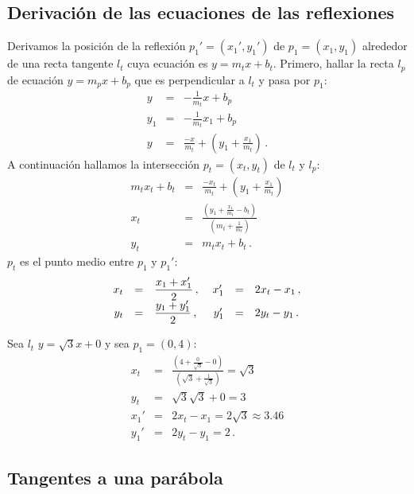 
\subsection{Derivación de las ecuaciones de las reflexiones}

Derivamos la posición de la reflexión $p_1'=(x_1',y_1')$ de $p_1=(x_1,y_1)$ alrededor de una recta tangente $l_t$ cuya ecuación es $y=m_tx+b_t$. Primero, hallar la recta $l_p$ de ecuación $y=m_px+b_p$ que es perpendicular a $l_t$ y pasa por $p_1$:
\begin{eqnarray*}
y&=&-\frac{1}{m_t}x+b_p\\
y_1&=&-\frac{1}{m_t}x_1+b_p\\
y&=&\frac{-x}{m_t}+\left(y_1+\frac{x_1}{m_t}\right)\,.
\end{eqnarray*}
A continuación hallamos la intersección $p_t=(x_t,y_t)$ de $l_t$ y $l_p$:
\begin{eqnarray*}
m_tx_t+b_t&=&\frac{-x_t}{m_t}+\left(y_1+\frac{x_1}{m_t}\right)\\
x_t&=&\frac{\left(y_1+\displaystyle\frac{x_1}{m_t}-b_t\right)}{\left(m_t+\displaystyle\frac{1}{m_t}\right)}\\
y_t&=&m_tx_t+b_t\,.
\end{eqnarray*}
$p_t$ es el punto medio entre $p_1$ y $p_1'$:
\[
\begin{array}{rcl@{\hspace{3ex}}rcl}
x_t&=&\displaystyle\frac{x_1+x_1'}{2}\,, &x_1'&=&2x_t-x_1\,,\\
y_t&=&\displaystyle\frac{y_1+y_1'}{2}\,,& y_1'&=&2y_t-y_1\,.
\end{array}
\]
\begin{example}
Sea $l_t$ $y=\sqrt{3}x+0$ y sea $p_1=(0,4)$:
\begin{eqnarray*}
x_t&=&\frac{\left(4+\displaystyle\frac{0}{\sqrt{3}}-0\right)}{\left(\sqrt{3}+\displaystyle\frac{1}{\sqrt{3}}\right)}=\sqrt{3}\\
y_t&=&\sqrt{3}\sqrt{3}+0=3\\
x_1'&=&2x_t-x_1=2\sqrt{3}\approx 3.46\\
y_1'&=&2y_t-y_1= 2\,.
\end{eqnarray*}
\end{example}


\subsection{Tangentes a una parábola}\label{s.parabola}


